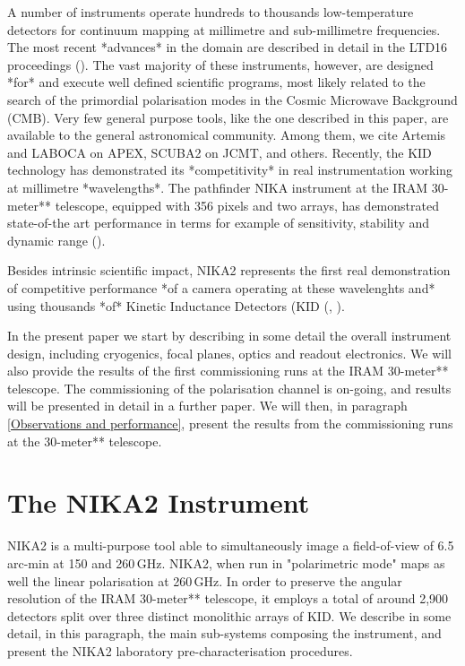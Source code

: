 \documentclass[]{aa} %
\begin{document}
A number of instruments operate hundreds to thousands low-temperature detectors
for continuum mapping at millimetre and sub-millimetre frequencies. The most
recent *advances* in the domain are described in detail in the LTD16
proceedings (\cite{ltd16:2016}). The vast majority of these instruments,
however, are designed *for* and execute well defined scientific programs, most likely
related to the search of the primordial polarisation modes in the Cosmic
Microwave Background (CMB). Very few general purpose tools, like the one
described in this paper, are available to the general astronomical
community. Among them, we cite Artemis and LABOCA on APEX, SCUBA2 on JCMT, and
others. Recently, the KID technology has demonstrated its *competitivity* in
real instrumentation working at millimetre *wavelengths*. The pathfinder NIKA
instrument at the IRAM 30-meter** telescope, equipped with 356 pixels and two
arrays, has demonstrated state-of-the art performance in terms for example of
sensitivity, stability and dynamic range (\cite{Catalano2014, Monfardini2011,
  Adam2014}).

Besides intrinsic scientific impact, NIKA2 represents the first real
demonstration of competitive performance *of a camera operating
at these wavelenghts and* using thousands *of* Kinetic
Inductance Detectors (KID (\cite{Day2003}, \cite{Doyle2010}).

In the present paper we start by describing in some detail the overall
instrument design, including cryogenics, focal planes, optics and readout
electronics. We will also provide the results of the first commissioning runs at
the IRAM 30-meter** telescope. The commissioning of the polarisation channel is
on-going, and results will be presented in detail in a further paper. We will
then, in paragraph \ref{Observations and performance}, present the results from
the commissioning runs at the 30-meter** telescope.


\section{The NIKA2 Instrument}

NIKA2 is a multi-purpose tool able to simultaneously image a field-of-view of
6.5\,arc-min at 150 and 260\,GHz. NIKA2, when run in "polarimetric mode" maps as
well the linear polarisation at 260\,GHz. In order to preserve the angular
resolution of the IRAM 30-meter** telescope, it employs a total of around
2,900\,detectors split over three distinct monolithic arrays of KID. We describe
in some detail, in this paragraph, the main sub-systems composing the
instrument, and present the NIKA2 laboratory pre-characterisation procedures.
\end{document}

